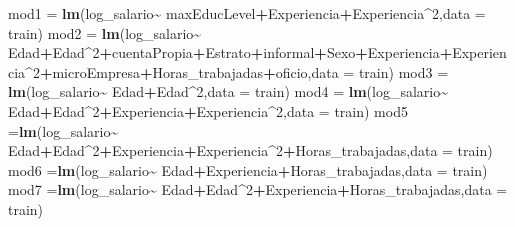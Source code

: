 \documentclass[
]{article}
\newenvironment{Shaded}{\begin{snugshade}}{\end{snugshade}}
\newcommand{\AttributeTok}[1]{\textcolor[rgb]{0.13,0.29,0.53}{#1}}
\newcommand{\DecValTok}[1]{\textcolor[rgb]{0.00,0.00,0.81}{#1}}
\newcommand{\FunctionTok}[1]{\textcolor[rgb]{0.13,0.29,0.53}{\textbf{#1}}}
\newcommand{\NormalTok}[1]{#1}
\newcommand{\OtherTok}[1]{\textcolor[rgb]{0.56,0.35,0.01}{#1}}
\newcommand{\SpecialCharTok}[1]{\textcolor[rgb]{0.81,0.36,0.00}{\textbf{#1}}}
\begin{document}
\begin{Shaded}
\begin{Highlighting}[]
\NormalTok{mod1 }\OtherTok{=} \FunctionTok{lm}\NormalTok{(log\_salario}\SpecialCharTok{\textasciitilde{}}\NormalTok{ maxEducLevel}\SpecialCharTok{+}\NormalTok{Experiencia}\SpecialCharTok{+}\NormalTok{Experiencia}\SpecialCharTok{\^{}}\DecValTok{2}\NormalTok{,}\AttributeTok{data =}\NormalTok{ train)}
\NormalTok{mod2 }\OtherTok{=} \FunctionTok{lm}\NormalTok{(log\_salario}\SpecialCharTok{\textasciitilde{}}\NormalTok{ Edad}\SpecialCharTok{+}\NormalTok{Edad}\SpecialCharTok{\^{}}\DecValTok{2}\SpecialCharTok{+}\NormalTok{cuentaPropia}\SpecialCharTok{+}\NormalTok{Estrato}\SpecialCharTok{+}\NormalTok{informal}\SpecialCharTok{+}\NormalTok{Sexo}\SpecialCharTok{+}\NormalTok{Experiencia}\SpecialCharTok{+}\NormalTok{Experiencia}\SpecialCharTok{\^{}}\DecValTok{2}\SpecialCharTok{+}\NormalTok{microEmpresa}\SpecialCharTok{+}\NormalTok{Horas\_trabajadas}\SpecialCharTok{+}\NormalTok{oficio,}\AttributeTok{data =}\NormalTok{ train)}
\NormalTok{mod3 }\OtherTok{=} \FunctionTok{lm}\NormalTok{(log\_salario}\SpecialCharTok{\textasciitilde{}}\NormalTok{ Edad}\SpecialCharTok{+}\NormalTok{Edad}\SpecialCharTok{\^{}}\DecValTok{2}\NormalTok{,}\AttributeTok{data =}\NormalTok{ train)}
\NormalTok{mod4 }\OtherTok{=} \FunctionTok{lm}\NormalTok{(log\_salario}\SpecialCharTok{\textasciitilde{}}\NormalTok{ Edad}\SpecialCharTok{+}\NormalTok{Edad}\SpecialCharTok{\^{}}\DecValTok{2}\SpecialCharTok{+}\NormalTok{Experiencia}\SpecialCharTok{+}\NormalTok{Experiencia}\SpecialCharTok{\^{}}\DecValTok{2}\NormalTok{,}\AttributeTok{data =}\NormalTok{ train)}
\NormalTok{mod5 }\OtherTok{=}\FunctionTok{lm}\NormalTok{(log\_salario}\SpecialCharTok{\textasciitilde{}}\NormalTok{ Edad}\SpecialCharTok{+}\NormalTok{Edad}\SpecialCharTok{\^{}}\DecValTok{2}\SpecialCharTok{+}\NormalTok{Experiencia}\SpecialCharTok{+}\NormalTok{Experiencia}\SpecialCharTok{\^{}}\DecValTok{2}\SpecialCharTok{+}\NormalTok{Horas\_trabajadas,}\AttributeTok{data =}\NormalTok{ train)}
\NormalTok{mod6 }\OtherTok{=}\FunctionTok{lm}\NormalTok{(log\_salario}\SpecialCharTok{\textasciitilde{}}\NormalTok{ Edad}\SpecialCharTok{+}\NormalTok{Experiencia}\SpecialCharTok{+}\NormalTok{Horas\_trabajadas,}\AttributeTok{data =}\NormalTok{ train)}
\NormalTok{mod7 }\OtherTok{=}\FunctionTok{lm}\NormalTok{(log\_salario}\SpecialCharTok{\textasciitilde{}}\NormalTok{ Edad}\SpecialCharTok{+}\NormalTok{Edad}\SpecialCharTok{\^{}}\DecValTok{2}\SpecialCharTok{+}\NormalTok{Experiencia}\SpecialCharTok{+}\NormalTok{Horas\_trabajadas,}\AttributeTok{data =}\NormalTok{ train)}

\end{Highlighting}
\end{Shaded}
\end{document}
